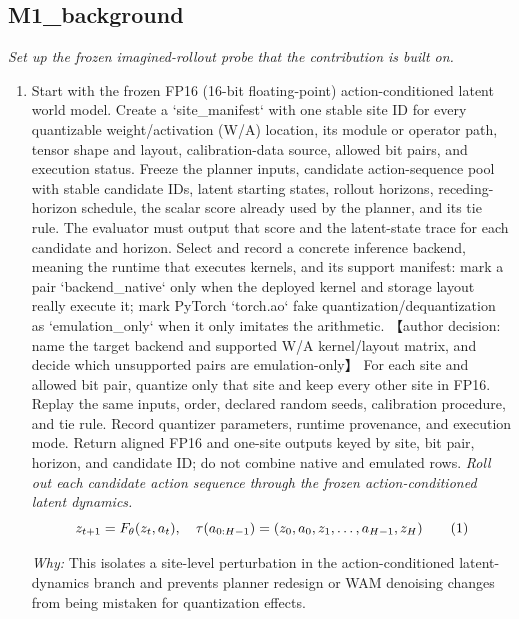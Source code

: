 \documentclass[10pt,a4paper]{article}
\begin{document}
\subsection*{M1\_background}
\emph{Set up the frozen imagined-rollout probe that the contribution is built on.}
\begin{enumerate}[leftmargin=*,start=1]
  \item Start with the frozen FP16 (16-bit floating-point) action-conditioned latent world model. Create a `site\_manifest` with one stable site ID for every quantizable weight/activation (W/A) location, its module or operator path, tensor shape and layout, calibration-data source, allowed bit pairs, and execution status. Freeze the planner inputs, candidate action-sequence pool with stable candidate IDs, latent starting states, rollout horizons, receding-horizon schedule, the scalar score already used by the planner, and its tie rule. The evaluator must output that score and the latent-state trace for each candidate and horizon. Select and record a concrete inference backend, meaning the runtime that executes kernels, and its support manifest: mark a pair `backend\_native` only when the deployed kernel and storage layout really execute it;\allowbreak{} mark PyTorch `torch.ao` fake quantization/dequantization as `emulation\_only` when it only imitates the arithmetic. 【author decision: name the target backend and supported W/A kernel/layout matrix, and decide which unsupported pairs are emulation-only】 For each site and allowed bit pair, quantize only that site and keep every other site in FP16. Replay the same inputs, order, declared random seeds, calibration procedure, and tie rule. Record quantizer parameters, runtime provenance, and execution mode. Return aligned FP16 and one-site outputs keyed by site, bit pair, horizon, and candidate ID;\allowbreak{} do not combine native and emulated rows.
\noindent\emph{Roll out each candidate action sequence through the frozen action-conditioned latent dynamics.}
\begin{equation}
\resizebox{\ifdim\width>\linewidth \linewidth\else\width\fi}{!}{$\displaystyle z_{t+1}=F_{\theta}(z_t,a_t),\quad \tau(a_{0:H-1})=(z_0,a_0,z_1,\ldots,a_{H-1},z_H)$} \tag{1}
\end{equation}
\par\emph{Why:} This isolates a site-level perturbation in the action-conditioned latent-dynamics branch and prevents planner redesign or WAM denoising changes from being mistaken for quantization effects.
\end{enumerate}
\end{document}
